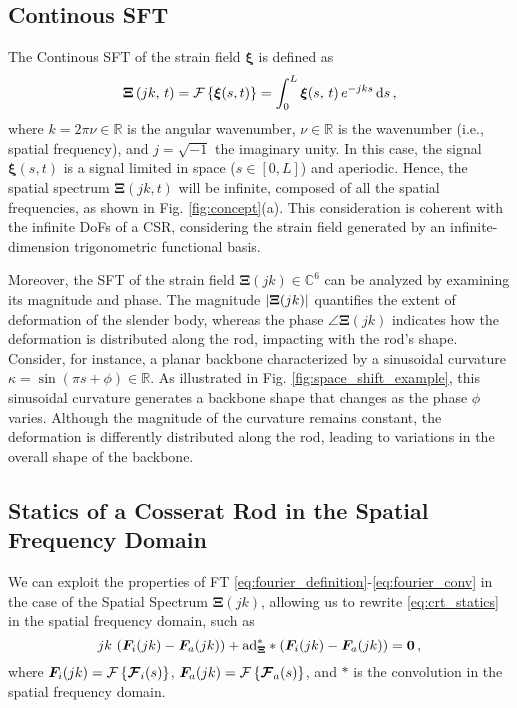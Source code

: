 \subsection{Continous \ac{SFT}} \label{spatial_ft:csft}
The Continous \ac{SFT} of the strain field $\bm{\xi}$ is defined as
\begin{equation} \label{eq:continous_spatial_fourier_transform}
    \bm{\Xi}\left(jk, \, t\right) = \mathcal{F}\left\{\bm{\xi}(s, t)\right\} = \int_{0}^{L} \bm{\xi}(s, \, t) \, e^{-jks} \, \textnormal{d} s \, ,
\end{equation}
where $k = 2 \pi \nu \in \mathbb{R}$ is the angular wavenumber, $\nu \in \mathbb{R}$ is the wavenumber (i.e., spatial frequency), and $j = \sqrt{-1}$ the imaginary unity. In this case, the signal $\bm{\xi}(s, t)$ is a signal limited in space ($s \in [0, L]$) and aperiodic. Hence, the spatial spectrum 
$\bm{\Xi}(j k, t)$ will be infinite, composed of all the spatial frequencies, as shown in Fig. \ref{fig:concept}(a). 
This consideration is coherent with the infinite \ac{DoFs} of a \ac{CSR}, considering the strain field generated by an infinite-dimension trigonometric functional basis.

Moreover, the \ac{SFT} of the strain field $\bm{\Xi}(jk) \in \mathbb{C}^{6}$ can be analyzed by examining its magnitude and phase. 
The magnitude $\left\lvert\bm{\Xi}(jk)\right\rvert$ quantifies the extent of deformation of the slender body, whereas the phase $\angle\bm{\Xi}(jk)$ indicates how the deformation is distributed along the rod, impacting with the rod's shape.
Consider, for instance, a planar backbone characterized by a sinusoidal curvature $\kappa = \sin\left(\pi s + \phi \right) \in \mathbb{R}$.
As illustrated in Fig. \ref{fig:space_shift_example}, this sinusoidal curvature generates a backbone shape that changes as the phase $\phi$ varies. Although the magnitude of the curvature remains constant, the deformation is differently distributed along the rod, leading to variations in the overall shape of the backbone.

\subsection{Statics of a Cosserat Rod in the Spatial Frequency Domain}
We can exploit the properties of \ac{FT} \eqref{eq:fourier_definition}-\eqref{eq:fourier_conv} in the case of the Spatial Spectrum $\bm{\Xi}(jk)$, allowing us to rewrite \eqref{eq:crt_statics} in the spatial frequency domain, such as
\begin{equation} \label{eq:static_ft}
    jk \, \left(\bm{F}_i(jk) - \bm{F}_a(jk)\right) + \textnormal{ad}_{\bm{\Xi}}^{*} \ast \left(\bm{F}_i(jk) - \bm{F}_a(jk)\right) = \bm{0} \, ,
\end{equation}
where $\bm{F}_i(jk) = \mathcal{F}\left\{\bm{\mathcal{F}}_i(s)\right\}$, $\bm{F}_a(jk) = \mathcal{F}\left\{\bm{\mathcal{F}}_a(s)\right\}$, and $\ast$ is the convolution in the spatial frequency domain.

